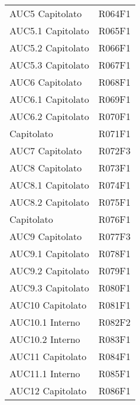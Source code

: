 \documentclass[../analisi-dei-requisiti.tex]{subfiles}
\begin{document}
\begin{longtable}[H]{ p{4cm} | p{4cm} }
  AUC5 Capitolato               & R064F1                               \\
  AUC5.1 Capitolato             & R065F1                               \\
  AUC5.2 Capitolato             & R066F1                               \\
  AUC5.3 Capitolato             & R067F1                               \\
  AUC6 Capitolato               & R068F1                               \\
  AUC6.1 Capitolato             & R069F1                               \\
  AUC6.2 Capitolato             & R070F1                               \\
  Capitolato                    & R071F1                               \\
  AUC7 Capitolato               & R072F3                               \\
  AUC8 Capitolato               & R073F1                               \\
  AUC8.1 Capitolato             & R074F1                               \\
  AUC8.2 Capitolato             & R075F1                               \\
  Capitolato                    & R076F1                               \\
  AUC9 Capitolato               & R077F3                               \\
  AUC9.1 Capitolato             & R078F1                               \\
  AUC9.2 Capitolato             & R079F1                               \\
  AUC9.3 Capitolato             & R080F1                               \\
  AUC10 Capitolato              & R081F1                               \\
  AUC10.1 Interno               & R082F2                               \\
  AUC10.2 Interno               & R083F1                               \\
  AUC11 Capitolato              & R084F1                               \\
  AUC11.1 Interno               & R085F1                               \\
  AUC12 Capitolato              & R086F1                               \\

\end{longtable}
\end{document}
